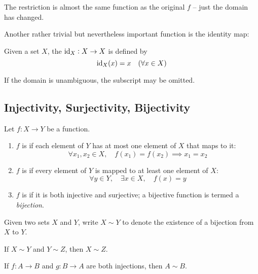 \begin{remark}
The restriction is almost the same function as the original $f$ -- just the domain has changed.
\end{remark}

Another rather trivial but nevertheless important function is the identity map:

\begin{definition}
Given a set $X$, the  $\operatorname{id}_X:X \to X$ is defined by
\[\operatorname{id}_X(x)=x\quad(\forall x\in X)\]
\end{definition}

\begin{notation}
If the domain is unambiguous, the subscript may be omitted.
\end{notation}

\subsection{Injectivity, Surjectivity, Bijectivity}
\begin{definition}
Let $f:X\to Y$ be a function.
\begin{enumerate}[label=(\roman*)]
\item $f$ is  if each element of $Y$ has at most one element of $X$ that maps to it:
\[\forall x_1,x_2\in X,\quad f(x_1)=f(x_2) \implies x_1=x_2\]

\item $f$ is  if every element of $Y$ is mapped to at least one element of $X$:
\[ \forall y\in Y,\quad\exists x\in X,\quad f(x)=y \]

\item $f$ is  if it is both injective and surjective; a bijective function is termed a \emph{bijection}.
\end{enumerate}
\end{definition}

\begin{notation}
Given two sets $X$ and $Y$, write $X\sim Y$ to denote the existence of a bijection from $X$ to $Y$.
\end{notation}

\begin{proposition}
If $X\sim Y$ and $Y\sim Z$, then $X\sim Z$.
\end{proposition}

\begin{theorem}
If $f:A\to B$ and $g:B\to A$ are both injections, then $A\sim B$.
\end{theorem}

